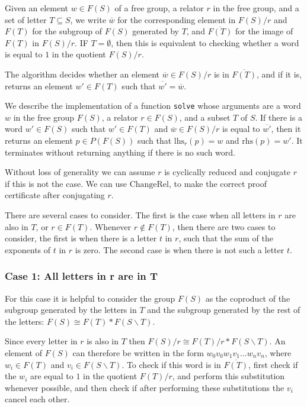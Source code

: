 \documentclass[12pt]{article} %
\theoremstyle{definition}
\theoremstyle{definition}
\theoremstyle{definition}
\theoremstyle{definition}
\begin{document}
Given an element $w \in F(S)$ of a free group,
a relator $r$ in the free group, and a set of letter $T \subseteq S$,
we write $\overline {w}$ for the corresponding element in $F(S) / r$
and $F(T)$ for the subgroup of $F(S)$ generated by $T$,
and $\overline{F(T)}$ for the image of $F(T)$ in $F(S)/r$. IF $T = \emptyset$,
then this is equivalent to checking whether a word is equal to $1$ in the quotient
$F(S) / r$.

The algorithm decides whether an element $\overline{w} \in F(S) / r$ is in $\overline{F(T)}$,
and if it is, returns an element $w' \in F(T)$ such that $\overline{w'} = \overline{w}$.

We describe the implementation of a function \lstinline{solve} whose arguments are a word $w$
in the free group $F(S)$, a relator $r \in F(S)$,
and a subset $T$ of $S$. If there is a word $w' \in F(S)$
such that $w' \in F(T)$ and $\overline{w} \in F(S) / r$ is
equal to $\overline{w'}$, then it returns an element $p \in P(F(S))$
such that $\text{lhs}_r(p) = w$ and $\text{rhs}(p) = w'$. It terminates
without returning anything if there is no such word.

Without loss of generality we can assume $r$ is cyclically reduced and
conjugate $r$ if this is not the case. We can use $\text{ChangeRel}$,
to make the correct proof certificate after conjugating $r$.

There are several cases to consider. The first is the case when all letters in $r$
are also in $T$, or $r \in F(T)$. Whenever $r \notin F(T)$, then there are two
cases to consider, the first is when there is a letter $t$ in $r$, such that
the sum of the exponents of $t$ in $r$ is zero.
The second case is when there is not such a letter $t$.

\subsubsection{Case 1: All letters in r are in T}\label{allinT}
For this case it is helpful to consider the group $F(S)$ as the
coproduct of the subgroup generated by the letters in $T$ and
the subgroup generated by the rest of the letters:
$F(S) \cong F(T) \ast F(S \backslash T)$.

Since every letter in $r$ is also in $T$ then $F(S) / r \cong F(T) / r \ast F(S \backslash T)$.
An element of $F(S)$ can therefore be written in the form
$w_0v_0w_1v_1 \dots w_nv_n$, where $w_i \in F(T)$ and $v_i \in F(S \backslash T)$.
To check if this word is in $\overline{F(T)}$, first check if the $w_i$ are equal
to $1$ in the quotient $F(T) / r$, and perform this substitution whenever possible,
and then check if after performing these substitutions the $v_i$ cancel each other.
\end{document}
